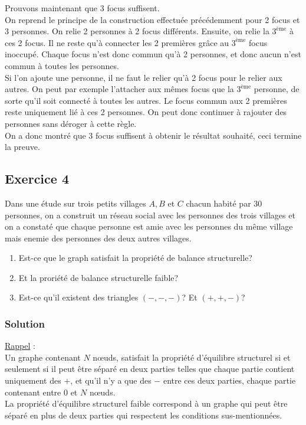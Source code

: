     Prouvons maintenant que 3 focus suffisent.\\
    On reprend le principe de la construction effectuée précédemment pour 2 focus et 3 personnes.
    On relie 2 personnes à 2 focus différents.
    Ensuite, on relie la $3^{\text{ème}}$ à ces 2 focus.
    Il ne reste qu'à connecter les 2 premières grâce au $3^{\text{ème}}$ focus inoccupé.
    Chaque focus n'est donc commun qu'à 2 personnes, et donc aucun n'est commun à toutes les personnes.\\
    Si l'on ajoute une personne, il ne faut le relier qu'à 2 focus pour le relier aux autres.
    On peut par exemple l'attacher aux mêmes focus que la $3^{\text{ème}}$ personne, de sorte qu'il soit connecté à toutes les autres.
    Le focus commun aux 2 premières reste uniquement lié à ces 2 personnes.
    On peut donc continuer à rajouter des personnes sans déroger à cette règle.\\
    On a donc montré que 3 focus suffisent à obtenir le résultat souhaité, ceci termine la preuve.
    

\subsection*{Exercice 4}
Dans une \'{e}tude sur trois petits villages $A, B$ et $C$ chacun habit\'{e} par 30 personnes, on a construit un r\'{e}seau social avec les personnes des trois villages et on a
constat\'{e} que chaque personne est amie avec les personnes du m\^{e}me village mais enemie des personnes des deux autres villages. 
\begin{enumerate}
\item Est-ce que le graph satisfait la propri\'{e}t\'{e} de balance structurelle? 
\item Et la prori\'{e}t\'{e} de balance structurelle faible?
\item Est-ce qu'il existent des triangles $(-,-,-)$? Et $(+,+,-)$?
\end{enumerate}

    \subsubsection*{Solution}
    \noindent \underline{Rappel} :\\
    Un graphe contenant $N$ n\oe{}uds, satisfait la propriété d'équilibre structurel si et seulement si il peut être séparé en deux parties telles que chaque partie contient uniquement des $+$, et qu'il n'y a que des $-$ entre ces deux parties, chaque partie contenant entre $0$ et $N$ n\oe{}uds.\\
    La propriété d'équilibre structurel faible correspond à un graphe qui peut être séparé en plus de deux parties qui respectent les conditions sus-mentionnées.

